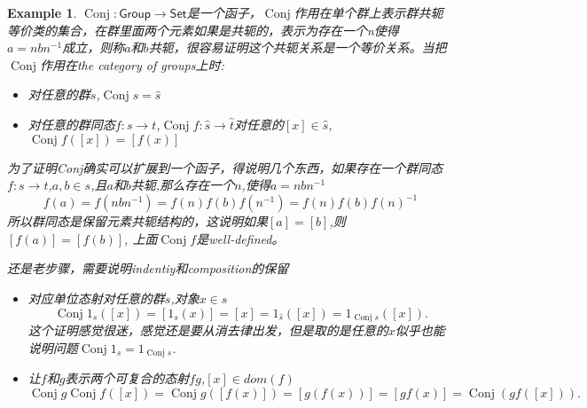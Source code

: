 \documentclass{article}
\newtheorem{example}[theorem]{Example}
\newcommand{\Set}{\textsf{Set}\xspace}
\newcommand{\Group}{\textsf{Group}\xspace}
\newcommand*{\xfunc}[4]{{#2}\colon{#3}{#1}{#4}}
\newcommand*{\func}[3]{\xfunc{\to}{#1}{#2}{#3}}
\DeclareMathOperator{\Conj}{Conj}
\begin{document}
\begin{example}
\rm $\func{\Conj}{\Group}{\Set}$是一个函子，$\Conj$作用在单个群上表示群共轭等价类的集合，在群里面两个元素如果是共轭的，表示为存在一个n使得$a=nbn^{-1}$成立，则称$a$和$b$共轭，很容易证明这个共轭关系是一个等价关系。当把$\Conj$作用在\emph{the category of groups}上时:
	\begin{itemize}
		\item 对任意的群$s$,\(\Conj s = \hat{s}\)
		\item 对任意的群同态\(\func{f}{s}{t}\),\(\func{\Conj f}{\hat{s}}{\hat{t}}\)对任意的\([x] \in \hat{s}\),\(\Conj f([x])=[f(x)]\)
	\end{itemize}
	
为了证明Conj确实可以扩展到一个函子，得说明几个东西，如果存在一个群同态$\func{f}{s}{t}$,$a,b \in s$,且$a$和$b$共轭,那么存在一个$n$,使得$a=nbn^{-1}$ \[f(a)=f(nbn^{-1})=f(n)f(b)f(n^{-1})=f(n)f(b)f(n)^{-1}\]所以群同态是保留元素共轭结构的，这说明如果$[a]=[b]$,则$[f(a)]=[f(b)]$, 上面$\Conj f$是well-defined。

还是老步骤，需要说明indentiy和composition的保留
\begin{itemize}
	\item 对应单位态射对任意的群$s$,对象$x \in s$ \[\Conj 1_s([x])=[1_s(x)]=[x]=1_{\hat{s}}([x])=1_{\Conj s}([x]).\]这个证明感觉很迷，感觉还是要从消去律出发，但是取的是任意的$x$似乎也能说明问题$\Conj 1_s = 1_{\Conj s}$.
	\item 让$f$和$g$表示两个可复合的态射$fg$,$[x] \in dom(f)$ \[\Conj g\Conj f([x])=\Conj g([f(x)])=[g(f(x))]=[gf(x)]=\Conj (gf([x])).\]
\end{itemize}	
\end{example}


\newpage
\end{document}
